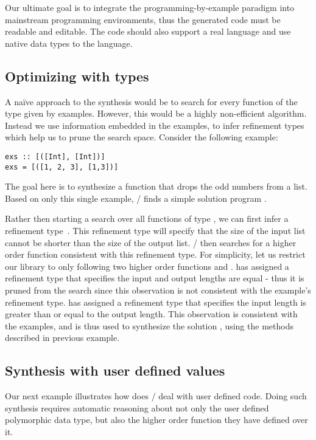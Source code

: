 Our ultimate goal is to integrate the programming-by-example paradigm 
into mainstream programming environments, thus the generated code must be readable and editable.
The code should also support a real language and use native data types to the language.


\subsection{Optimizing with types}
\label{sec:exampleFilter}

A na\"ive approach to the synthesis would be to search 
for every function of the type given by examples. However, this would be
a highly non-efficient algorithm.
Instead we use information embedded in the examples, to infer refinement types which help us to prune the search space.
Consider the following example:
\begin{lstlisting}
exs :: [([Int], [Int])]
exs = [([1, 2, 3], [1,3])]
\end{lstlisting}
The goal here is to synthesize a function that drops the odd numbers from a list. Based on only this single example, \ourTool/ finds a simple solution program .

Rather then starting a search over all functions of type \codeinline{[Int] -> [Int]}, we can first infer a refinement 
type~\cite{DBLP:conf/icfp/VazouSJVJ14}.
This refinement type will specify that the size of the input list cannot
be shorter than the size of the output list.
\ourTool/ then searches for a higher order function consistent with this refinement type.
For simplicity, let us restrict our library to only following two
higher order functions  and .
 has assigned a refinement type that specifies the input and output lengths are equal - thus it is pruned from the search since this observation is not consistent with the example's refinement type.
 has assigned a refinement type that specifies the input length is greater than or equal to the output length.
This observation is consistent with the examples, and is thus used to synthesize the solution , using the methods described in previous example.


\subsection{Synthesis with user defined values}
\label{sec:exampleBTree}

Our next example illustrates how does  \ourTool/ deal with user defined code. Doing such synthesis requires automatic reasoning about not only the user defined polymorphic data type, but also the higher order function they have defined over it.

